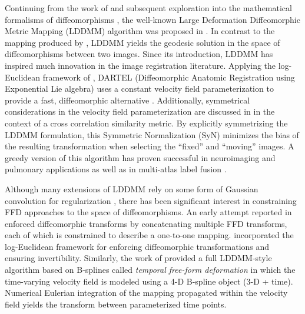 \documentclass{frontiersSCNS}
\begin{document}
Continuing from the work of \cite{christensen1996} and subsequent
exploration into the mathematical formalisms of diffeomorphisms
\citep[e.g.][]{dupuis1998}, the well-known Large Deformation
Diffeomorphic Metric Mapping (LDDMM) algorithm was proposed in
\cite{beg2005}.  In contrast to the mapping produced by
\cite{christensen1996}, LDDMM yields the geodesic solution in the
space of diffeomorphisms between two images. Since its introduction,
LDDMM has inspired much innovation in the image registration
literature.  Applying the log-Euclidean framework of
\cite{arsigny2006}, DARTEL (Diffeomorphic Anatomic Registration using
Exponential Lie algebra) uses a constant velocity field
parameterization to provide a fast, diffeomorphic alternative
\citep{ashburner2007}. Additionally, symmetrical considerations in the
velocity field parameterization are discussed in \cite{avants2008} in
the context of a cross correlation similarity metric.  By explicitly
symmetrizing the LDDMM formulation, this Symmetric Normalization (SyN)
minimizes the bias of the resulting transformation when selecting the
``fixed'' and ``moving'' images.  A greedy version of this algorithm
has proven successful in neuroimaging \citep{klein2009} and pulmonary
\citep{murphy2011} applications as well as in multi-atlas label fusion \citep{wang2012}.





Although many extensions of LDDMM rely on some form of Gaussian
convolution for regularization \citep[e.g.][]{risser2011}, there has
been significant interest in constraining FFD approaches to the space
of diffeomorphisms.  An early attempt reported in \cite{rueckert2006}
enforced diffeomorphic transforms by concatenating multiple FFD
transforms, each of which is constrained to describe a one-to-one
mapping.  \cite{modat2011} incorporated the log-Euclidean framework
for enforcing diffeomorphic transformations and ensuring
invertibility.  Similarly, the work of \cite{de-craene2011} provided a
full LDDMM-style algorithm based on B-splines called {\it temporal
free-form deformation} in which the time-varying velocity field is
modeled using a 4-D B-spline object (3-D + time).  Numerical Eulerian
integration of the mapping propagated within the velocity field yields
the transform between parameterized time points.
\end{document}
